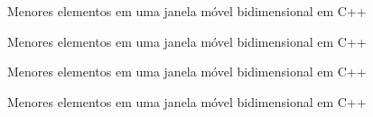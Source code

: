 \begin{frame}[fragile]{Menores elementos em uma janela móvel bidimensional em C++}
\end{frame}

\begin{frame}[fragile]{Menores elementos em uma janela móvel bidimensional em C++}
\end{frame}

\begin{frame}[fragile]{Menores elementos em uma janela móvel bidimensional em C++}
\end{frame}

\begin{frame}[fragile]{Menores elementos em uma janela móvel bidimensional em C++}
\end{frame}

